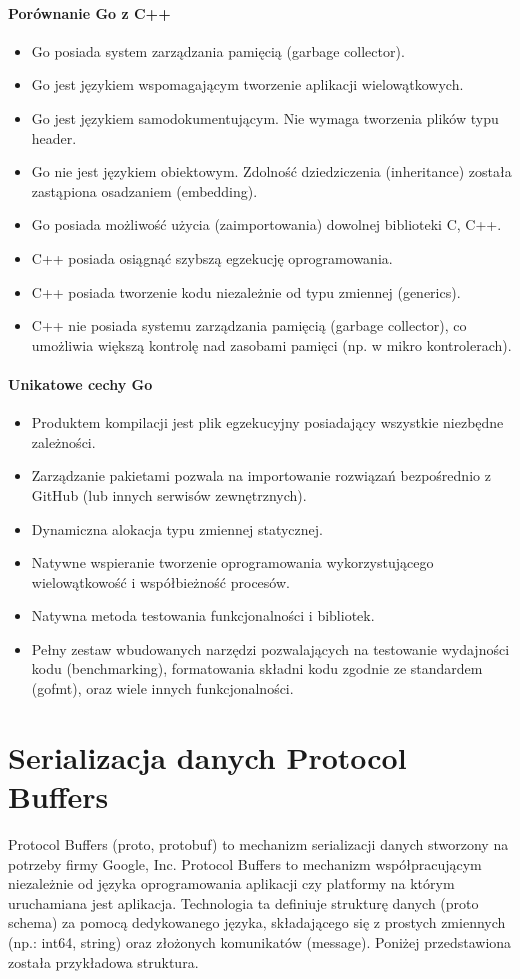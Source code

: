 \documentclass[a4paper,12pt,twoside,openany]{report}
\begin{document}
\paragraph{Porównanie Go z C++}
\begin{itemize}
 \item Go posiada system zarządzania pamięcią (garbage collector).
 \item Go jest językiem wspomagającym tworzenie aplikacji wielowątkowych.
 \item Go jest językiem samodokumentującym. Nie wymaga tworzenia plików typu header.
 \item Go nie jest językiem obiektowym. Zdolność dziedziczenia (inheritance) została zastąpiona osadzaniem (embedding).
 \item Go posiada możliwość użycia (zaimportowania) dowolnej biblioteki C, C++.
 \item C++ posiada osiągnąć szybszą egzekucję oprogramowania.
 \item C++ posiada tworzenie kodu niezależnie od typu zmiennej (generics).
 \item C++ nie posiada systemu zarządzania pamięcią (garbage collector), co umożliwia większą kontrolę nad zasobami pamięci (np. w mikro kontrolerach).
\end{itemize}

\paragraph{Unikatowe cechy Go}
\begin{itemize}
 \item Produktem kompilacji jest plik egzekucyjny posiadający wszystkie niezbędne zależności.
 \item Zarządzanie pakietami pozwala na importowanie rozwiązań bezpośrednio z GitHub (lub innych serwisów zewnętrznych).
 \item Dynamiczna alokacja typu zmiennej statycznej.
 \item Natywne wspieranie tworzenie oprogramowania wykorzystującego wielowątkowość i współbieżność procesów.
 \item Natywna metoda testowania funkcjonalności i bibliotek.
 \item Pełny zestaw wbudowanych narzędzi pozwalających na testowanie wydajności kodu (benchmarking), formatowania składni kodu zgodnie ze standardem (gofmt),
       oraz wiele innych funkcjonalności.
\end{itemize}

\section{Serializacja danych Protocol Buffers}
Protocol Buffers (proto, protobuf) to mechanizm serializacji danych stworzony na potrzeby firmy Google, Inc.
Protocol Buffers to mechanizm współpracującym niezależnie od języka oprogramowania aplikacji czy platformy na którym uruchamiana jest aplikacja.
Technologia ta definiuje strukturę danych (proto schema) za pomocą dedykowanego języka, składającego się z prostych zmiennych (np.: int64, string) 
oraz złożonych komunikatów (message). Poniżej przedstawiona została przykładowa struktura.
\end{document}
